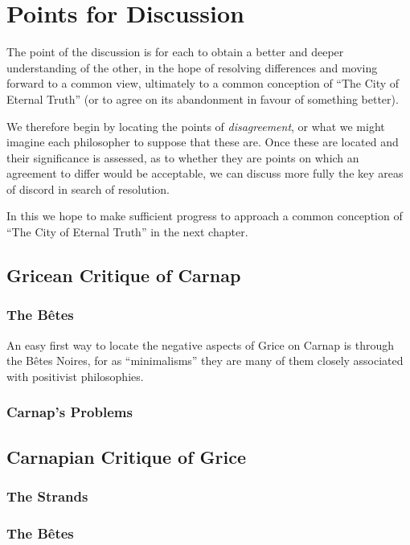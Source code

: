 \documentclass[10pt,titlepage]{book}
\begin{document}
\chapter{Points for Discussion}

The point of the discussion is for each to obtain a better and deeper understanding of the other, in the hope of resolving differences and moving forward to a common view, ultimately to a common conception of ``The City of Eternal Truth'' (or to agree on its abandonment in favour of something better).

We therefore begin by locating the points of \emph{disagreement}, or what we might imagine each philosopher to suppose that these are.
Once these are located and their significance is assessed, as to whether they are points on which an agreement to differ would be acceptable, we can discuss more fully the key areas of discord in search of resolution.

In this we hope to make sufficient progress to approach a common conception of ``The City of Eternal Truth'' in the next chapter.

\section{Gricean Critique of Carnap}

\subsection{The B\^etes}

An easy first way to locate the negative aspects of Grice on Carnap is through the B\^etes Noires, for as ``minimalisms'' they are many of them closely associated with positivist philosophies.

\subsection{Carnap's Problems}

\section{Carnapian Critique of Grice}

\subsection{The Strands}

\subsection{The B\^etes}
\end{document}
